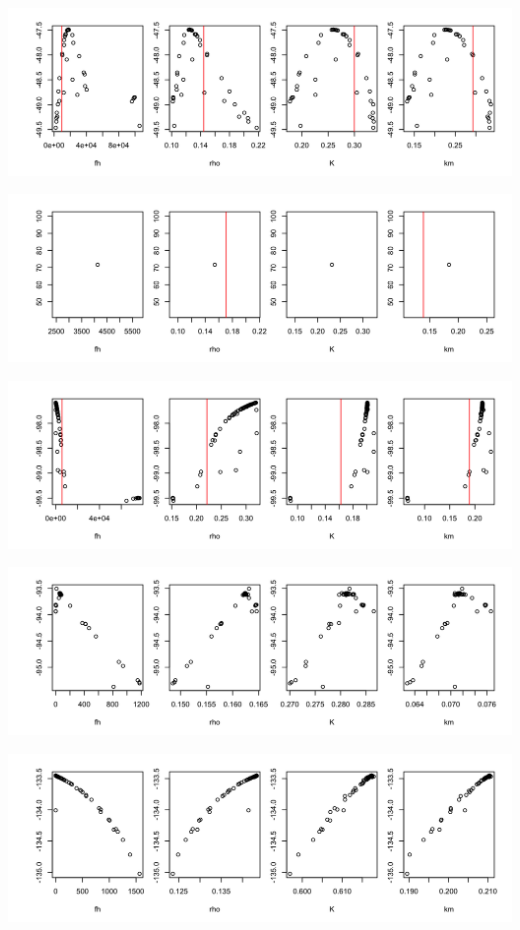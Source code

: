 \documentclass[12pt,reqno,final,pdftex]{amsart}\usepackage[]{graphicx}\usepackage[]{color}
\newenvironment{knitrout}{}{} %
\theoremstyle{plain}
\numberwithin{equation}{part}
\begin{document}
\begin{knitrout}
\includegraphics[width=\linewidth]{figure/unnamed-chunk-4-5} \hfill{}




\includegraphics[width=\linewidth]{figure/unnamed-chunk-4-6} \hfill{}




\includegraphics[width=\linewidth]{figure/unnamed-chunk-4-7} \hfill{}




\includegraphics[width=\linewidth]{figure/unnamed-chunk-4-8} \hfill{}




\includegraphics[width=\linewidth]{figure/unnamed-chunk-4-9} \hfill{}





\end{knitrout}
\end{document}
